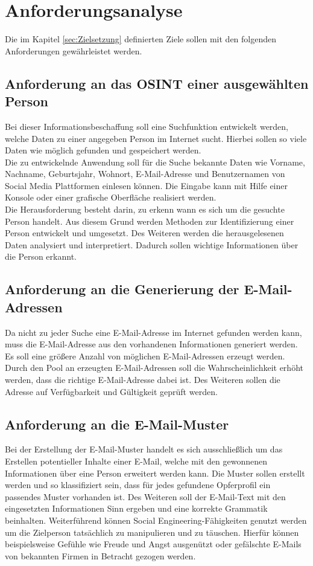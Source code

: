 
\chapter{Anforderungsanalyse}  %
\label{cha:Anforderungsanalyse} %
Die im Kapitel \ref{sec:Zielsetzung} definierten Ziele sollen mit den folgenden Anforderungen gewährleistet werden.

\section{Anforderung an das OSINT einer ausgewählten Person}
Bei dieser Informationsbeschaffung soll eine Suchfunktion entwickelt werden, welche Daten zu einer angegeben Person im Internet sucht. Hierbei sollen so viele Daten wie möglich gefunden und gespeichert werden.\\
Die zu entwickelnde Anwendung soll für die Suche bekannte Daten wie Vorname, Nachname, Geburtsjahr, Wohnort, E-Mail-Adresse und Benutzernamen von Social Media Plattformen einlesen können. Die Eingabe kann mit Hilfe einer Konsole oder einer grafische Oberfläche realisiert werden.\\
Die Herausforderung besteht darin, zu erkenn wann es sich um die gesuchte Person handelt. Aus diesem Grund werden Methoden zur Identifizierung einer Person entwickelt und umgesetzt. Des Weiteren werden die herausgelesenen Daten analysiert und interpretiert. Dadurch sollen wichtige Informationen über die Person erkannt.
	
\section{Anforderung an die Generierung der E-Mail-Adressen}
Da nicht zu jeder Suche eine E-Mail-Adresse im Internet gefunden werden kann, muss die E-Mail-Adresse aus den vorhandenen Informationen generiert werden. Es soll eine größere Anzahl von möglichen E-Mail-Adressen erzeugt werden. Durch den Pool an erzeugten E-Mail-Adressen soll die Wahrscheinlichkeit erhöht werden, dass die richtige E-Mail-Adresse dabei ist. Des Weiteren sollen die Adresse auf Verfügbarkeit und Gültigkeit geprüft werden.
	
\section{Anforderung an die E-Mail-Muster}
Bei der Erstellung der E-Mail-Muster handelt es sich ausschließlich um das Erstellen potentieller Inhalte einer E-Mail, welche mit den gewonnenen Informationen über eine Person erweitert werden kann. Die Muster sollen erstellt werden und so klassifiziert sein, dass für jedes gefundene Opferprofil ein passendes Muster vorhanden ist. Des Weiteren soll der E-Mail-Text mit den eingesetzten Informationen Sinn ergeben und eine korrekte Grammatik beinhalten. Weiterführend können Social Engineering-Fähigkeiten genutzt werden um die Zielperson tatsächlich zu manipulieren und zu täuschen. Hierfür können beispielsweise Gefühle wie Freude und Angst ausgenützt oder gefälschte E-Mails von bekannten Firmen in Betracht gezogen werden.
	
